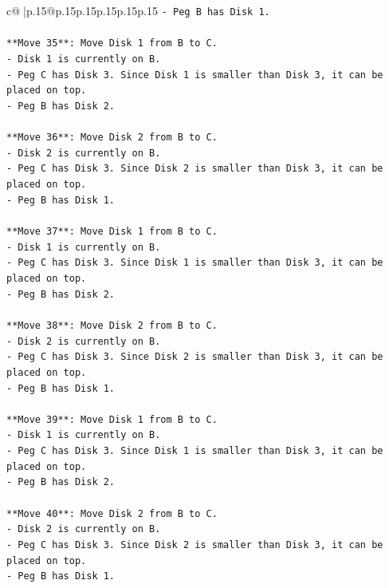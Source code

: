 \documentclass{article}
\begin{document}
{\begin{supertabular}{c@{$\;$}|p{.15\linewidth}@{}p{.15\linewidth}p{.15\linewidth}p{.15\linewidth}p{.15\linewidth}p{.15\linewidth}}
{{{\texttt{{-} Peg B has Disk 1.} \\
\\ 
\texttt{**Move 35**: Move Disk 1 from B to C.} \\
\texttt{{-} Disk 1 is currently on B.} \\
\texttt{{-} Peg C has Disk 3. Since Disk 1 is smaller than Disk 3, it can be placed on top.} \\
\texttt{{-} Peg B has Disk 2.} \\
\\ 
\texttt{**Move 36**: Move Disk 2 from B to C.} \\
\texttt{{-} Disk 2 is currently on B.} \\
\texttt{{-} Peg C has Disk 3. Since Disk 2 is smaller than Disk 3, it can be placed on top.} \\
\texttt{{-} Peg B has Disk 1.} \\
\\ 
\texttt{**Move 37**: Move Disk 1 from B to C.} \\
\texttt{{-} Disk 1 is currently on B.} \\
\texttt{{-} Peg C has Disk 3. Since Disk 1 is smaller than Disk 3, it can be placed on top.} \\
\texttt{{-} Peg B has Disk 2.} \\
\\ 
\texttt{**Move 38**: Move Disk 2 from B to C.} \\
\texttt{{-} Disk 2 is currently on B.} \\
\texttt{{-} Peg C has Disk 3. Since Disk 2 is smaller than Disk 3, it can be placed on top.} \\
\texttt{{-} Peg B has Disk 1.} \\
\\ 
\texttt{**Move 39**: Move Disk 1 from B to C.} \\
\texttt{{-} Disk 1 is currently on B.} \\
\texttt{{-} Peg C has Disk 3. Since Disk 1 is smaller than Disk 3, it can be placed on top.} \\
\texttt{{-} Peg B has Disk 2.} \\
\\ 
\texttt{**Move 40**: Move Disk 2 from B to C.} \\
\texttt{{-} Disk 2 is currently on B.} \\
\texttt{{-} Peg C has Disk 3. Since Disk 2 is smaller than Disk 3, it can be placed on top.} \\
\texttt{{-} Peg B has Disk 1.} \\
}}}
\end{supertabular}}
\end{document}
